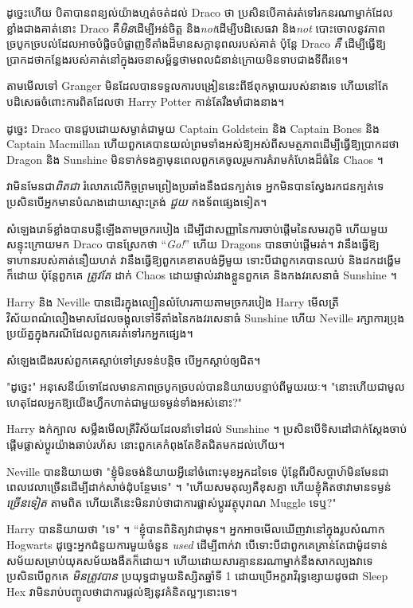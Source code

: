 ដូច្នេះហើយ បិតាបានពន្យល់យ៉ាងហ្មត់ចត់ដល់ Draco ថា ប្រសិនបើគាត់រត់ទៅរកនរណាម្នាក់ដែលខ្លាំងជាងគាត់នោះ Draco គឺ\emph{មិន}ដើម្បីអន់ចិត្ត និង\emph{not}ដើម្បីបដិសេធវា និង\emph{not} បោះចោលនូវភាពច្របូកច្របល់ដែលអាចបំផ្លិចបំផ្លាញទីតាំងដ៏មានសក្តានុពលរបស់គាត់ ប៉ុន្តែ Draco \emph{គឺ} ដើម្បីធ្វើឱ្យប្រាកដថាកន្លែងរបស់គាត់នៅក្នុងរចនាសម្ព័ន្ធថាមពលជំនាន់ក្រោយមិនទាបជាងទីពីរទេ។

តាមមើលទៅ Granger មិនដែលបានទទួលការបង្រៀននេះពីឪពុកម្តាយរបស់នាងទេ ហើយនៅតែបដិសេធចំពោះការពិតដែលថា Harry Potter កាន់តែរឹងមាំជាងនាង។

ដូច្នេះ Draco បានជួបដោយសម្ងាត់ជាមួយ Captain Goldstein និង Captain Bones និង Captain Macmillan ហើយពួកគេបានយល់ព្រមទាំងអស់ឱ្យអស់ពីសមត្ថភាពដើម្បីធ្វើឱ្យប្រាកដថា Dragon និង Sunshine មិនទាក់ទងគ្នាមុនពេលពួកគេចូលរួមការគំរាមកំហែងដ៏ធំនៃ Chaos ។

វាមិនមែនជា\emph{ពិតជា} រំលោភលើកិច្ចព្រមព្រៀងប្រឆាំងនឹងជនក្បត់ទេ អ្នកមិនបានស្វែងរកជនក្បត់ទេ ប្រសិនបើអ្នកមានបំណងដោយស្មោះត្រង់ \emph{ជួយ} កងទ័ពផ្សេងទៀត។

សំឡេងរោទ៍ខ្លាំងបានបន្លឺឡើងតាមច្រករបៀង ដើម្បីជាសញ្ញានៃការចាប់ផ្តើមនៃសមរភូមិ ហើយមួយសន្ទុះក្រោយមក Draco បានស្រែកថា “\emph{Go!}” ហើយ Dragons បានចាប់ផ្តើមរត់។ វានឹងធ្វើឱ្យទាហានរបស់គាត់នឿយហត់ វានឹងធ្វើឱ្យពួកគេខាតបង់អ្វីមួយ ទោះបីជាពួកគេបានឈប់ និងដកដង្ហើមក៏ដោយ ប៉ុន្តែពួកគេ \emph{ត្រូវតែ} ដាក់ Chaos ដោយផ្ទាល់រវាងខ្លួនពួកគេ និងកងវរសេនាធំ Sunshine ។

\later

Harry និង Neville បានដើរក្នុងល្បឿនលំហែរកាយតាមច្រករបៀង Harry មើលត្រីវិស័យពណ៌លឿងមាសដែលចង្អុលទៅទីតាំងនៃកងវរសេនាធំ Sunshine ហើយ Neville រក្សាការប្រុងប្រយ័ត្នក្នុងករណីដែលពួកគេរត់ទៅរកអ្នកផ្សេង។

សំឡេង​ជើង​របស់​ពួក​គេ​ស្តាប់​ទៅ​ស្រទន់​បន្តិច បើ​អ្នក​ស្តាប់​ឲ្យ​ជិត។

"ដូច្នេះ" អនុសេនីយ៍ទោដែលមានភាពច្របូកច្របល់បាននិយាយបន្ទាប់ពីមួយរយៈ។ "នោះហើយជាមូលហេតុដែលអ្នកឱ្យយើងហ្វឹកហាត់ជាមួយទម្ងន់ទាំងអស់នោះ?"

Harry ងក់ក្បាល សម្លឹងមើលត្រីវិស័យដែលនាំទៅដល់ Sunshine ។ ប្រសិនបើទិសដៅជាក់ស្តែងចាប់ផ្តើមផ្លាស់ប្តូរយ៉ាងឆាប់រហ័ស នោះពួកគេកំពុងតែខិតជិតមកដល់ហើយ។

Neville បាននិយាយថា "ខ្ញុំមិនចង់និយាយអ្វីនៅចំពោះមុខអ្នកដទៃទេ ប៉ុន្តែពីរបីសប្តាហ៍មិនមែនជាពេលវេលាច្រើនដើម្បីដាក់សាច់ដុំបន្ថែមទេ" ។ "ហើយសមតុល្យគឺខុសគ្នា ហើយខ្ញុំគិតថាវាមានទម្ងន់ \emph{ច្រើនទៀត} តាមពិត ហើយតើនេះមិនរាប់ថាជាការផ្លាស់ប្តូរវត្ថុបុរាណ Muggle ទេឬ?"

Harry បាននិយាយថា "ទេ" ។ “ខ្ញុំបានពិនិត្យវាជាមុន។ អ្នកអាចមើលឃើញវានៅក្នុងរូបសំណាក Hogwarts ដូច្នេះអ្នកជំនួយការមួយចំនួន \emph{used} ដើម្បីពាក់វា បើទោះបីជាពួកគេគ្រាន់តែជាម៉ូដទាន់សម័យសម្រាប់យុគសម័យងងឹតក៏ដោយ។ ហើយដោយសារគ្មាននរណាម្នាក់នឹងសាកល្បងវាទេ ប្រសិនបើពួកគេ \emph{មិនត្រូវបាន} ប្រយុទ្ធជាមួយនិស្សិតឆ្នាំទី 1 ដោយប្រើអក្ខរាវិរុទ្ធខ្សោយដូចជា Sleep Hex វាមិនរាប់បញ្ចូលថាជាការផ្តល់ឱ្យនូវគំនិតល្អៗនោះទេ។

